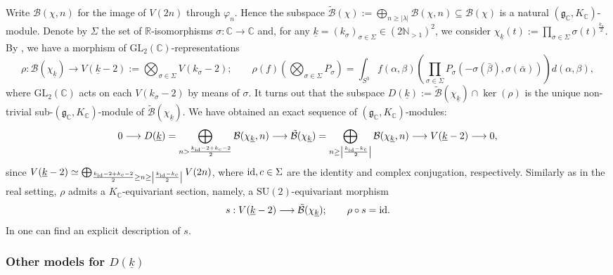 \documentclass{amsart}
\theoremstyle{definition}
\theoremstyle{remark}
\numberwithin{equation}{section}
\newcommand{\GL}{{\mathrm{GL}}}
\newcommand{\SU}{{\mathrm{SU}}}
\newcommand{\C}{{\mathbb C}}
\newcommand{\R}{{\mathbb R}}
\newcommand{\N}{{\mathbb N}}
\newcommand{\cB}{{\mathcal B}}
\newcommand{\mfg}{{\mathfrak g}}
\begin{document}
Write $\cB(\chi,n)$ for the image of $V(2n)$ through $\varphi_n$. Hence the subspace
$\tilde \cB(\chi):=\bigoplus_{n\geq |\lambda|}\cB(\chi,n)\subseteq \cB(\chi)$ 
is a natural $(\mfg_\C,K_\C)$-module. Denote by $\Sigma$ the set of $\R$-isomorphisms $\sigma\colon \C\rightarrow\C$ and, for any $\underline{k}=(k_\sigma)_{\sigma\in\Sigma}\in (2\N_{>1})^2$, we consider $\chi_{\underline{k}}(t):=\prod_{\sigma\in\Sigma}\sigma(t)^{\frac{k_\sigma}{2}}$. By \cite[Proposition 4.18]{preprintsanti2}, we have a morphism of $\GL_2(\C)$-representations
\[
\rho:\cB(\chi_{\underline{k}})\longrightarrow V(\underline{k}-2):=\bigotimes_{\sigma\in\Sigma}V(k_\sigma-2); \qquad
 \rho(f)\left(\bigotimes_{\sigma\in\Sigma}P_\sigma\right)= \int_{S^3}f(\alpha,\beta)\left(\prod_{\sigma\in\Sigma} P_\sigma(-\sigma(\bar\beta),\sigma(\bar\alpha))\right)d(\alpha,\beta),
\]
where $\GL_2(\C)$ acts on each $V(k_\sigma-2)$ by means of $\sigma$.
It turns out that the subspace $D(\underline{k}):=\tilde \cB(\chi_{\underline{k}})\cap \ker(\rho)$ is the unique non-trivial sub-$(\mfg_\C,K_\C)$-module of $\tilde\cB(\chi_{\underline{k}})$. We have obtained an exact sequence of $(\mfg_\C,K_\C)$-modules:
\begin{equation}\label{exseq2}
0\longrightarrow D(\underline{k})=\bigoplus_{n>\frac{k_{\rm id}-2+k_c-2}{2}}\cB(\chi_{\underline{k}},n)\longrightarrow \tilde \cB(\chi_{\underline{k}})=\bigoplus_{n\geq \left|\frac{k_{\rm id}-k_c}{2}\right|}\cB(\chi_{\underline{k}},n)\longrightarrow V(\underline{k}-2)\longrightarrow 0,
\end{equation}
since $V(\underline{k}-2)\simeq\bigoplus_{\frac{k_{\rm id}-2+k_c-2}{2}\geq n\geq \left|\frac{k_{\rm id}-k_c}{2}\right|} V(2n)$, where ${\rm id},c\in\Sigma$ are the identity and complex conjugation, respectively.  
Similarly as in the real setting, $\rho$ admits a $K_\C$-equivariant section, namely, 
a $\SU(2)$-equivariant morphism
\[
s:V(\underline{k}-2)\longrightarrow \tilde\cB(\chi_{\underline{k}});\qquad \rho\circ s={\rm id}.
\]
In \cite[Lemma 4.21]{preprintsanti2} one can find an explicit description of $s$.


\subsubsection{Other models for $D(\underline k)$}\label{othermod}
\end{document}
